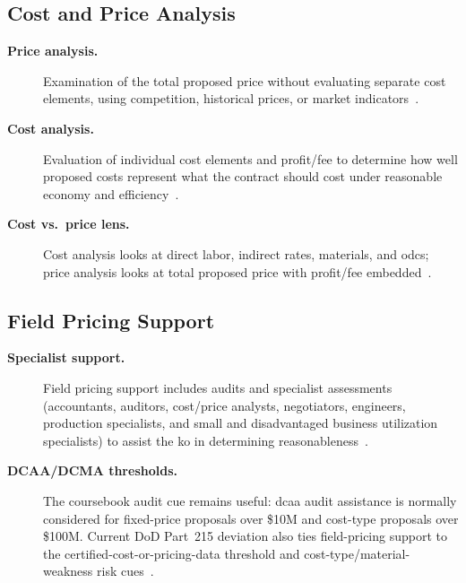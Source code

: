 \documentclass[../main.tex]{subfiles}
\begin{document}
\subsection{Cost and Price Analysis}
\begin{description}
  \item[\textbf{Price analysis.}] Examination of the total proposed price without evaluating separate cost elements, using competition, historical prices, or market indicators~\autocite{FAR-15-404-1-Proposal-Analysis}.
  \item[\textbf{Cost analysis.}] Evaluation of individual cost elements and profit/fee to determine how well proposed costs represent what the contract should cost under reasonable economy and efficiency~\autocite{edo-3-2-4-cost-price-evaluation-2025,FAR-15-404-1-Proposal-Analysis}.
  \item[\textbf{Cost vs.\ price lens.}] Cost analysis looks at direct labor, indirect rates, materials, and \acp{odc}; price analysis looks at total proposed price with profit/fee embedded~\autocite{edo-3-2-4-cost-price-evaluation-2025,FAR-15-404-1-Proposal-Analysis}.
\end{description}

\subsection{Field Pricing Support}
\begin{description}
  \item[\textbf{Specialist support.}] Field pricing support includes audits and specialist assessments (accountants, auditors, cost/price analysts, negotiators, engineers, production specialists, and small and disadvantaged business utilization specialists) to assist the \ac{ko} in determining reasonableness~\autocite{edo-3-2-4-cost-price-evaluation-2025,FAR-15-404-2-Field-Pricing-Assistance}.
  \item[\textbf{DCAA/DCMA thresholds.}] The coursebook audit cue remains useful: \ac{dcaa} audit assistance is normally considered for fixed-price proposals over \$10M and cost-type proposals over \$100M. Current DoD Part~215 deviation also ties field-pricing support to the certified-cost-or-pricing-data threshold and cost-type/material-weakness risk cues~\autocite{DFARS-Part215-Deviation-2026,edo-3-2-4-cost-price-evaluation-2025,FAR-15-404-2-Field-Pricing-Assistance}.
\end{description}
\end{document}
